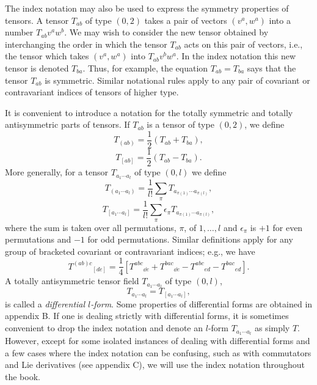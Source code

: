 The index notation may also be used to express the symmetry properties of tensors.
A tensor \(T_{ab}\) of type \((0,2)\) takes a pair of vectors \((v^a,w^a)\) into a
number \(T_{ab}v^aw^b\).  We may wish to consider the new tensor obtained by
interchanging the order in which the tensor \(T_{ab}\) acts on this pair of vectors,
i.e., the tensor which takes \((v^a,w^a)\) into \(T_{ab}v^bw^a\).  In the index
notation this new tensor is denoted \(T_{ba}\).  Thus, for example, the equation
\(T_{ab}=T_{ba}\) says that the tensor \(T_{ab}\) is symmetric.  Similar notational
rules apply to any pair of covariant or contravariant indices of tensors of higher
type.

It is convenient to introduce a notation for the totally symmetric and totally
antisymmetric parts of tensors.  If \(T_{ab}\) is a tensor of type \((0,2)\), we
define
\begin{equation}
  T_{(ab)}=\frac{1}{2}\left(T_{ab}+T_{ba}\right) ,
  \tag{2.4.1}\label{eq:2.4.1}
\end{equation}
\begin{equation}
  T_{[ab]}=\frac{1}{2}\left(T_{ab}-T_{ba}\right) .
  \tag{2.4.2}\label{eq:2.4.2}
\end{equation}
More generally, for a tensor \(T_{a_1\cdots a_l}\) of type \((0,l)\) we define
\begin{equation}
  T_{(a_1\cdots a_l)}=
  \frac{1}{l!}\sum_\pi T_{a_{\pi(1)}\cdots a_{\pi(l)}} ,
  \tag{2.4.3}\label{eq:2.4.3}
\end{equation}
\begin{equation}
  T_{[a_1\cdots a_l]}=
  \frac{1}{l!}\sum_\pi\epsilon_\pi T_{a_{\pi(1)}\cdots a_{\pi(l)}} ,
  \tag{2.4.4}\label{eq:2.4.4}
\end{equation}
where the sum is taken over all permutations, \(\pi\), of \(1,\ldots,l\) and
\(\epsilon_\pi\) is \(+1\) for even permutations and \(-1\) for odd permutations.
Similar definitions apply for any group of bracketed covariant or contravariant
indices; e.g., we have
\begin{equation}
  T^{(ab)c}{}_{[de]}=
  \frac{1}{4}\left[T^{abc}{}_{\dd e}+T^{bac}{}_{\dd e}
  -T^{abc}{}_{ed}-T^{bac}{}_{ed}\right] .
  \tag{2.4.5}\label{eq:2.4.5}
\end{equation}
A totally antisymmetric tensor field \(T_{a_1\cdots a_l}\) of type \((0,l)\),
\begin{equation}
  T_{a_1\cdots a_l}=T_{[a_1\cdots a_l]} ,
  \tag{2.4.6}\label{eq:2.4.6}
\end{equation}
is called a \emph{differential \(l\)-form}.  Some properties of differential forms
are obtained in appendix B.  If one is dealing strictly with differential forms, it
is sometimes convenient to drop the index notation and denote an \(l\)-form
\(T_{a_1\cdots a_l}\) as simply \(T\).  However, except for some isolated
instances of dealing with differential forms and a few cases where the index
notation can be confusing, such as with commutators and Lie derivatives (see
appendix C), we will use the index notation throughout the book.
